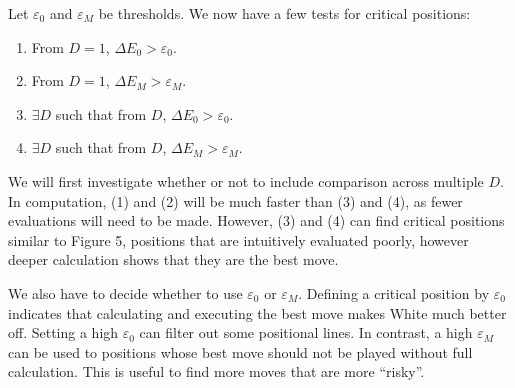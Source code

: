 \documentclass{article}
\begin{document}
\begin{adjustbox}{right=9.9cm}
\end{adjustbox}

Let $\varepsilon_0$ and $\varepsilon_M$ be thresholds. We now have a few tests for critical positions:
\begin{enumerate}
    \item From $D=1$, $\Delta E_0 > \varepsilon_0$.
    \item From $D=1$, $\Delta E_M > \varepsilon_M$.
    \item $\exists D$ such that from $D$, $\Delta E_0 > \varepsilon_0$.
    \item $\exists D$ such that from $D$, $\Delta E_M > \varepsilon_M$.
\end{enumerate}

We will first investigate whether or not to include comparison across multiple $D$. In computation, (1) and (2) will be much faster than (3) and (4), as fewer evaluations will need to be made. However, (3) and (4) can find critical positions similar to Figure 5, positions that are intuitively evaluated poorly, however deeper calculation shows that they are the best move.

We also have to decide whether to use $\varepsilon_0$ or $\varepsilon_M$. Defining a critical position by $\varepsilon_0$ indicates that calculating and executing the best move makes White much better off. Setting a high $\varepsilon_0$ can filter out some positional lines. In contrast, a high $\varepsilon_M$ can be used to positions whose best move should not be played without full calculation. This is useful to find more moves that are more ``risky''. 
\end{document}
